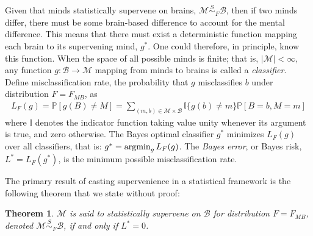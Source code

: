 \documentclass{article}
\newcommand{\mB}{\mathcal{B}}
\newcommand{\mM}{\mathcal{M}}
\newcommand{\PP}{\mathbb{P}}           %
\newcommand{\II}{\mathbb{I}}           %
\providecommand{\mc}[1]{\mathcal{#1}}
\providecommand{\mh}[1]{\widehat{#1}}
\newcommand{\argmin}{\operatornamewithlimits{argmin}}
\newcommand{\MsB}{\mM \overset{S}{\sim}_{F} \mB}
\newcommand{\from}{\colon}
\newtheorem{thm}{Theorem}
\begin{document}
Given that minds statistically supervene on brains, $\MsB$, then if two minds differ, there must be some brain-based difference to account for the mental difference.  This means that there must exist a deterministic function mapping each brain to its supervening mind, $g^*$. One could therefore, in principle, know this function. When the space of all possible minds is finite; that is, $|\mM| < \infty$, any function $g\from \mB \to \mM$ mapping from minds to brains is called a \emph{classifier}.  
Define misclassification rate, the probability that $g$ misclassifies $b$ under distribution $F=F_{MB}$,  as
\begin{align}
L_{F}(g) = \PP[g(B) \neq M] =  \sum_{(m,b) \in \mc{M} \times \mc{B}} \II\{g(b) \neq m\} \PP[B=b, M=m]	
\end{align}
where $\II$ denotes the indicator function taking value unity whenever its argument is true, and zero otherwise.  The Bayes optimal classifier $g^*$ minimizes $L_{F}(g)$ over all classifiers, that is:	
$g^* = \argmin_{g} L_{F}(g)$.
The \emph{Bayes error}, or Bayes risk, $L^*=L_{F}(g^*)$, is the minimum possible misclassification rate.

The primary result of casting supervenience in a statistical framework is the following theorem that we state without proof: 
\begin{thm}
\label{thm1} 
$\mM$ is said to \textit{statistically supervene} on $\mB$ for distribution $F=F_{MB}$, denoted $\mM \overset{S}{\sim}_{F} \mB$, if and only if $L^*= 0$. %
\end{thm}

\end{document}
